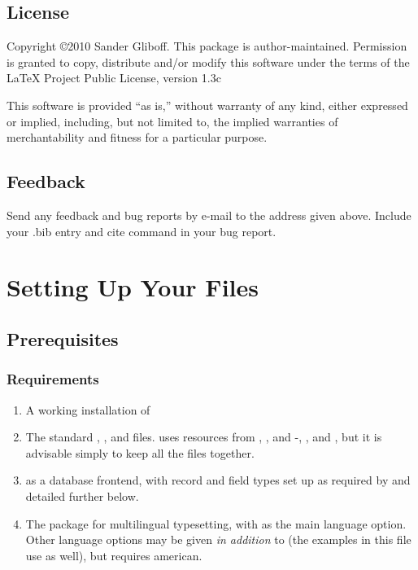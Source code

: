\documentclass{ltxdockit}[2010/02/12]
\begin{document}
\subsection{License} 
Copyright \copyright 2010 Sander Gliboff. This package is author-maintained. 
Permission is granted to copy, distribute and/or modify this software under the 
terms of the LaTeX Project Public License, version 1.3c

This software is provided ``as is,'' without warranty of any kind, either expressed or implied, including, but not limited to, the implied warranties of merchantability and fitness for a particular purpose. 

\subsection{Feedback} 
Send any feedback and bug reports by e-mail to the address given above. Include your .bib entry and cite command in your bug report.





\section{Setting Up Your Files}

\subsection{Prerequisites }
\subsubsection{Requirements}
\begin{enumerate}
\item A working installation of 
\item The standard  , , and  files.  uses resources from , ,  and -, , and , but it is advisable simply to keep all the  files together.
\item \bibtex as a database frontend, with record and field types set up as required by  and detailed further below.
\item The  package for multilingual typesetting, with  as the main language option. Other language options may be given \emph{in addition} to  (the examples in this file use  as well), but  requires american.
\end{enumerate}
\end{document}
